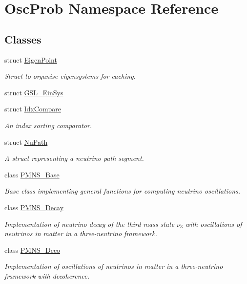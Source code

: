 \hypertarget{namespaceOscProb}{}\section{Osc\+Prob Namespace Reference}
\label{namespaceOscProb}
\subsection*{Classes}
\begin{DoxyCompactItemize}
\item 
struct \hyperlink{structOscProb_1_1EigenPoint}{Eigen\+Point}
\begin{DoxyCompactList}\small\item\em Struct to organise eigensystems for caching. \end{DoxyCompactList}\item 
struct \hyperlink{structOscProb_1_1GSL__EinSys}{G\+S\+L\+\_\+\+Ein\+Sys}
\item 
struct \hyperlink{structOscProb_1_1IdxCompare}{Idx\+Compare}
\begin{DoxyCompactList}\small\item\em An index sorting comparator. \end{DoxyCompactList}\item 
struct \hyperlink{structOscProb_1_1NuPath}{Nu\+Path}
\begin{DoxyCompactList}\small\item\em A struct representing a neutrino path segment. \end{DoxyCompactList}\item 
class \hyperlink{classOscProb_1_1PMNS__Base}{P\+M\+N\+S\+\_\+\+Base}
\begin{DoxyCompactList}\small\item\em Base class implementing general functions for computing neutrino oscillations. \end{DoxyCompactList}\item 
class \hyperlink{classOscProb_1_1PMNS__Decay}{P\+M\+N\+S\+\_\+\+Decay}
\begin{DoxyCompactList}\small\item\em Implementation of neutrino decay of the third mass state $\nu_3$ with oscillations of neutrinos in matter in a three-\/neutrino framework. \end{DoxyCompactList}\item 
class \hyperlink{classOscProb_1_1PMNS__Deco}{P\+M\+N\+S\+\_\+\+Deco}
\begin{DoxyCompactList}\small\item\em Implementation of oscillations of neutrinos in matter in a three-\/neutrino framework with decoherence. \end{DoxyCompactList}\item 

\end{DoxyCompactItemize}
